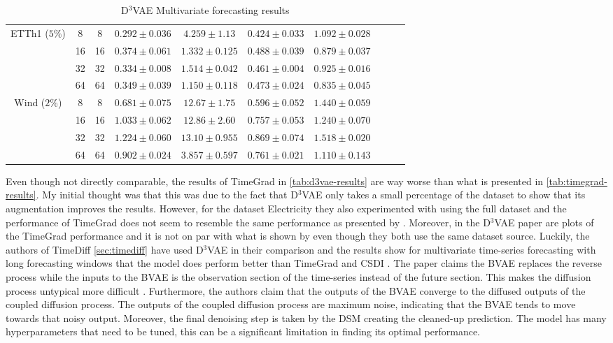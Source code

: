 \begin{table}[ht]
\begin{tabular}{cccccccccc}
        \midrule
        \multirow{4}{*}{ETTh1 ($5\%$)} & 8  & 8  & $0.292 \pm 0.036$ & $4.259 \pm 1.13$  & $0.424 \pm 0.033$ & $1.092 \pm 0.028$ \\
         & 16 & 16 & $0.374 \pm 0.061$ & $1.332 \pm 0.125$ & $0.488 \pm 0.039$ & $0.879 \pm 0.037$ \\
         & 32 & 32 & $0.334 \pm 0.008$ & $1.514 \pm 0.042$ & $0.461 \pm 0.004$ & $0.925 \pm 0.016$ \\
         & 64 & 64 & $0.349 \pm 0.039$ & $1.150 \pm 0.118$ & $0.473 \pm 0.024$ & $0.835 \pm 0.045$ \\
        \midrule
        \multirow{4}{*}{Wind ($2\%$)} & 8  & 8  & $0.681 \pm 0.075$ & $12.67 \pm 1.75$  & $0.596 \pm 0.052$ & $1.440 \pm 0.059$ \\
         & 16 & 16 & $1.033 \pm 0.062$ & $12.86 \pm 2.60$  & $0.757 \pm 0.053$ & $1.240 \pm 0.070$ \\
         & 32 & 32 & $1.224 \pm 0.060$ & $13.10 \pm 0.955$ & $0.869 \pm 0.074$ & $1.518 \pm 0.020$ \\
         & 64 & 64 & $0.902 \pm 0.024$ & $3.857 \pm 0.597$ & $0.761 \pm 0.021$ & $1.110 \pm 0.143$ \\
        \bottomrule
    \end{tabular}
    \caption{D$^3$VAE Multivariate forecasting results \cite{li_generative_2022}}
    \label{tab:d3vae-results}
\end{table}

Even though not directly comparable, the results of TimeGrad in \autoref{tab:d3vae-results} are way worse than what is presented in \autoref{tab:timegrad-results}. My initial thought was that this was due to the fact that D$^3$VAE only takes a small percentage of the dataset to show that its augmentation improves the results. However, for the dataset Electricity they also experimented with using the full dataset and the performance of TimeGrad does not seem to resemble the same performance as presented by \textcite{rasul_autoregressive_2021}. Moreover, in the D$^3$VAE paper are plots of the TimeGrad performance and it is not on par with what is shown by \textcite{rasul_autoregressive_2021} even though they both use the same dataset source.
Luckily, the authors of TimeDiff \ref{sec:timediff} have used D$^3$VAE in their comparison and the results show for multivariate time-series forecasting with long forecasting windows that the model does perform better than TimeGrad and CSDI \cite{shen_non-autoregressive_2023}.
The paper claims the BVAE replaces the reverse process while the inputs to the BVAE is the observation section of the time-series instead of the future section. This makes the diffusion process untypical more difficult \cite{shen_non-autoregressive_2023}. Furthermore, the authors claim that the outputs of the BVAE converge to the diffused outputs of the coupled diffusion process. The outputs of the coupled diffusion process are maximum noise, indicating that the BVAE tends to move towards that noisy output. Moreover, the final denoising step is taken by the DSM creating the cleaned-up prediction.
The model has many hyperparameters that need to be tuned, this can be a significant limitation in finding its optimal performance.